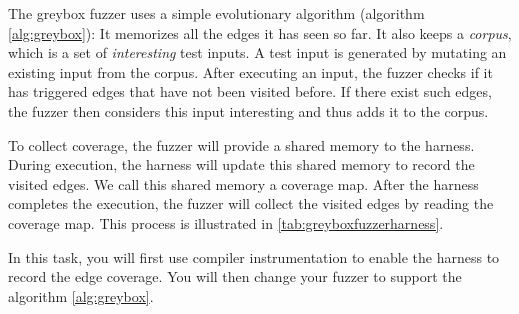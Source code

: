 \documentclass[letterpaper,11pt]{article}
\begin{document}



The greybox fuzzer uses a simple evolutionary algorithm (algorithm \autoref{alg:greybox}):
It memorizes all the edges it has seen so far.
It also keeps a \textit{corpus}, which is a set of \textit{interesting} test inputs.
A test input is generated by mutating an existing input from the corpus.
After executing an input, the fuzzer checks if it has triggered edges that have not been visited before.
If there exist such edges, the fuzzer then considers this input interesting and thus adds it to the corpus.


To collect coverage, the fuzzer will provide a shared memory to the harness.
During execution, the harness will update this shared memory to record the visited edges.
We call this shared memory a coverage map.
After the harness completes the execution, the fuzzer will collect the visited edges by reading the coverage map.
This process is illustrated in \autoref{tab:greyboxfuzzerharness}.

In this task, you will first use compiler instrumentation to enable the harness to record the edge coverage.
You will then change your fuzzer to support the algorithm \autoref{alg:greybox}.

\end{document}
